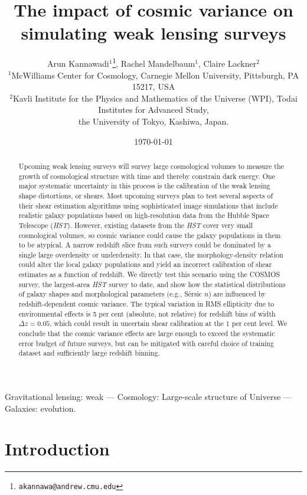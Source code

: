 \documentclass[twocolumn,useAMS,usenatbib]{mn2e}
\title[Cosmic variance in simulations]{The impact of cosmic variance on simulating weak lensing surveys}
\author[Kannawadi et al.]
{Arun Kannawadi$^1$\thanks{\tt akannawa@andrew.cmu.edu}, 
Rachel Mandelbaum$^1$,
Claire Lackner$^2$
\\$^1$McWilliams Center for Cosmology, Carnegie Mellon University, Pittsburgh, PA 15217, USA
\\$^2$Kavli Institute for the Physics and Mathematics of the Universe (WPI), Todai Institutes for Advanced Study,\\ the University of Tokyo, Kashiwa, Japan.
}
\date{\today}
\begin{document}

\maketitle

\begin{abstract}
Upcoming weak lensing surveys will survey large cosmological volumes to measure the growth of cosmological structure with time and
thereby constrain dark energy.  One major systematic uncertainty in
this process is the calibration of the weak lensing shape distortions,
or shears.  Most upcoming surveys plan to test several aspects of their shear
estimation algorithms using sophisticated image simulations that
include 
realistic galaxy populations based on high-resolution data from the
Hubble Space Telescope ({\em HST}).  However, existing datasets
from the {\em HST} cover very small cosmological volumes, so cosmic variance could cause the galaxy populations in them
to be atypical. A narrow redshift slice from such surveys could be dominated by a single large overdensity or underdensity.  In that case, the
morphology-density relation could alter the local galaxy
populations and yield an incorrect calibration of shear estimates as a function of redshift. We directly test this scenario using the COSMOS survey, the largest-area {\em HST} survey to date, and show how the
statistical distributions of galaxy shapes and
morphological parameters (e.g., S\'{e}rsic $n$)
are influenced by redshift-dependent cosmic variance. 
The typical variation in RMS ellipticity due to environmental effects
is 5 per cent (absolute, not relative) for redshift bins of width $\Delta z=0.05$, which could result in uncertain shear calibration at the 1 per cent level. 
We conclude that the cosmic variance effects are large enough to exceed the systematic error budget of future surveys, but can be mitigated with careful choice of training dataset and sufficiently large redshift binning.
\end{abstract}

\begin{keywords}
 Gravitational lensing: weak --- Cosmology: Large-scale structure of Universe --- Galaxies: evolution.
\end{keywords}


\section{Introduction}
\label{S:intro}
\end{document}
